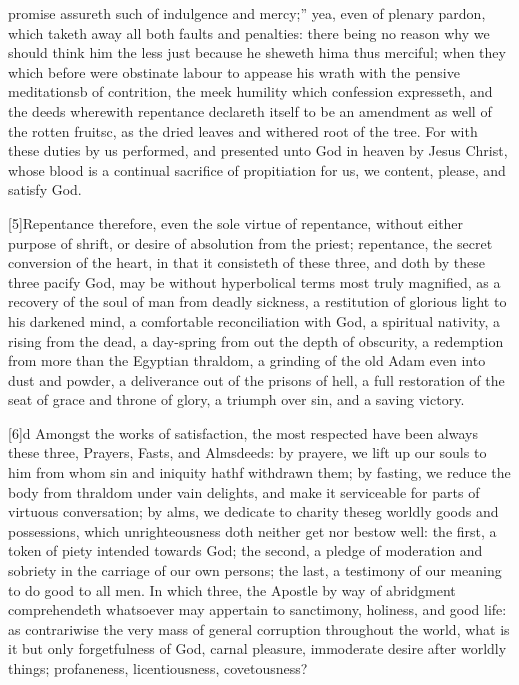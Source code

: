 promise assureth such of indulgence and mercy;” yea, even of plenary pardon, which taketh away all both faults and penalties: there being no reason why we should think him the less just because he sheweth hima thus merciful; when they which before were obstinate labour to appease his wrath with the pensive meditationsb of contrition, the meek humility which confession expresseth, and the deeds wherewith repentance declareth itself to be an amendment as well of the rotten fruitsc, as the dried leaves and withered root of the tree. For with these duties by us performed, and presented unto God in heaven by Jesus Christ, whose blood is a continual sacrifice of propitiation for us, we content, please, and satisfy God.

[5]Repentance therefore, even the sole virtue of repentance, without either purpose of shrift, or desire of absolution from the priest; repentance, the secret conversion of the heart, in that it consisteth of these three, and doth by these three pacify God, may be without hyperbolical terms most truly magnified, as a recovery of the soul of man from deadly sickness, a restitution of glorious light to his darkened mind, a comfortable reconciliation with God, a spiritual nativity, a rising from the dead, a day-spring from out the depth of obscurity, a redemption from more than the Egyptian thraldom, a grinding of the old Adam even into dust and powder, a deliverance out of the prisons of hell, a full restoration of the seat of grace and throne of glory, a triumph over sin, and a saving victory.

[6]d Amongst the works of satisfaction, the most respected have been always these three, Prayers, Fasts, and Almsdeeds: by prayere, we lift up our souls to him from whom sin and iniquity hathf withdrawn them; by fasting, we reduce the body from thraldom under vain delights, and make it serviceable for parts of virtuous conversation; by alms,  we dedicate to charity theseg worldly goods and possessions, which unrighteousness doth neither get nor bestow well: the first, a token of piety intended towards God; the second, a pledge of moderation and sobriety in the carriage of our own persons; the last, a testimony of our meaning to do good to all men. In which three, the Apostle by way of abridgment comprehendeth whatsoever may appertain to sanctimony, holiness, and good life: as contrariwise the very mass of general corruption throughout the world, what is it but only forgetfulness of God, carnal pleasure, immoderate desire after worldly things; profaneness, licentiousness, covetousness?

